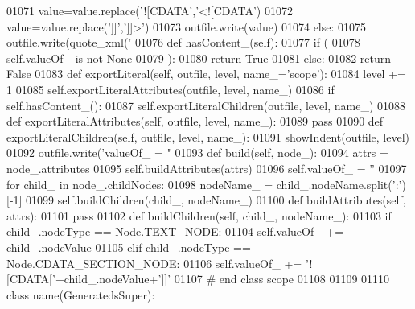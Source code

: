 \begin{DoxyCode}
{{{{{{{{{{{{{{{{{{{{{{{{{{{{{{{{{{{{{{{{{{{{{{{{{{{{{{01071             value=value.replace(\textcolor{stringliteral}{'![CDATA'},\textcolor{stringliteral}{'<![CDATA'})
01072             value=value.replace(\textcolor{stringliteral}{']]'},\textcolor{stringliteral}{']]>'})
01073             outfile.write(value)
01074         \textcolor{keywordflow}{else}:
01075             outfile.write(quote_xml(\textcolor{stringliteral}{'%
01076     \textcolor{keyword}{def }hasContent_(self):
01077         \textcolor{keywordflow}{if} (
01078             self.valueOf_ \textcolor{keywordflow}{is} \textcolor{keywordflow}{not} \textcolor{keywordtype}{None}
01079             ):
01080             \textcolor{keywordflow}{return} \textcolor{keyword}{True}
01081         \textcolor{keywordflow}{else}:
01082             \textcolor{keywordflow}{return} \textcolor{keyword}{False}
01083     \textcolor{keyword}{def }exportLiteral(self, outfile, level, name\_='scope'):
01084         level += 1
01085         self.exportLiteralAttributes(outfile, level, name\_)
01086         \textcolor{keywordflow}{if} self.hasContent_():
01087             self.exportLiteralChildren(outfile, level, name\_)
01088     \textcolor{keyword}{def }exportLiteralAttributes(self, outfile, level, name\_):
01089         \textcolor{keywordflow}{pass}
01090     \textcolor{keyword}{def }exportLiteralChildren(self, outfile, level, name\_):
01091         showIndent(outfile, level)
01092         outfile.write(\textcolor{stringliteral}{'valueOf\_ = "%
01093     \textcolor{keyword}{def }build(self, node\_):
01094         attrs = node\_.attributes
01095         self.buildAttributes(attrs)
01096         self.valueOf_ = \textcolor{stringliteral}{''}
01097         \textcolor{keywordflow}{for} child\_ \textcolor{keywordflow}{in} node\_.childNodes:
01098             nodeName\_ = child\_.nodeName.split(\textcolor{stringliteral}{':'})[-1]
01099             self.buildChildren(child\_, nodeName\_)
01100     \textcolor{keyword}{def }buildAttributes(self, attrs):
01101         \textcolor{keywordflow}{pass}
01102     \textcolor{keyword}{def }buildChildren(self, child\_, nodeName\_):
01103         \textcolor{keywordflow}{if} child\_.nodeType == Node.TEXT\_NODE:
01104             self.valueOf\_ += child\_.nodeValue
01105         \textcolor{keywordflow}{elif} child\_.nodeType == Node.CDATA\_SECTION\_NODE:
01106             self.valueOf\_ += \textcolor{stringliteral}{'![CDATA['}+child\_.nodeValue+\textcolor{stringliteral}{']]'}
01107 \textcolor{comment}{# end class scope}
01108 
01109 
01110 \textcolor{keyword}{class }name(GeneratedsSuper):
}}}}}}}}}}}}}}}}}}}}}}}}}}}}}}}}}}}}}}}}}}}}}}}}}}}}}}}}
\end{DoxyCode}
